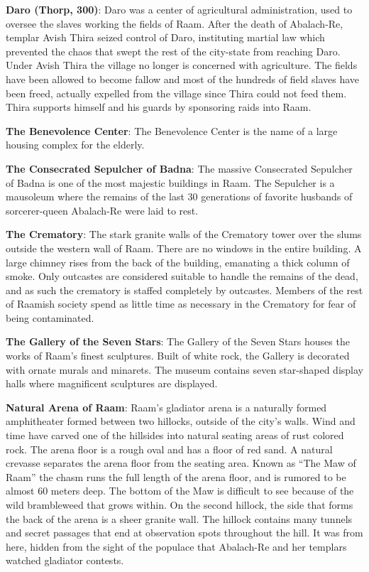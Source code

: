 {
	\textbf{Daro (Thorp, 300)}: Daro was a center of agricultural administration, used to oversee the slaves working the fields of Raam. After the death of Abalach-Re, templar Avish Thira seized control of Daro, instituting martial law which prevented the chaos that swept the rest of the city-state from reaching Daro. Under Avish Thira the village no longer is concerned with agriculture. The fields have been allowed to become fallow and most of the hundreds of field slaves have been freed, actually expelled from the village since Thira could not feed them. Thira supports himself and his guards by sponsoring raids into Raam.
}
{
	\textbf{The Benevolence Center}: The Benevolence Center is the name of a large housing complex for the elderly.

	\textbf{The Consecrated Sepulcher of Badna}: The massive Consecrated Sepulcher of Badna is one of the most majestic buildings in Raam. The Sepulcher is a mausoleum where the remains of the last 30 generations of favorite husbands of sorcerer-queen Abalach-Re were laid to rest.

	\textbf{The Crematory}: The stark granite walls of the Crematory tower over the slums outside the western wall of Raam. There are no windows in the entire building. A large chimney rises from the back of the building, emanating a thick column of smoke. Only outcastes are considered suitable to handle the remains of the dead, and as such the crematory is staffed completely by outcastes. Members of the rest of Raamish society spend as little time as necessary in the Crematory for fear of being contaminated.

	\textbf{The Gallery of the Seven Stars}: The Gallery of the Seven Stars houses the works of Raam's finest sculptures. Built of white rock, the Gallery is decorated with ornate murals and minarets. The museum contains seven star-shaped display halls where magnificent sculptures are displayed.

	\textbf{Natural Arena of Raam}: Raam's gladiator arena is a naturally formed amphitheater formed between two hillocks, outside of the city's walls. Wind and time have carved one of the hillsides into natural seating areas of rust colored rock. The arena floor is a rough oval and has a floor of red sand. A natural crevasse separates the arena floor from the seating area. Known as ``The Maw of Raam'' the chasm runs the full length of the arena floor, and is rumored to be almost 60 meters deep. The bottom of the Maw is difficult to see because of the wild brambleweed that grows within. On the second hillock, the side that forms the back of the arena is a sheer granite wall. The hillock contains many tunnels and secret passages that end at observation spots throughout the hill. It was from here, hidden from the sight of the populace that Abalach-Re and her templars watched gladiator contests.

}

